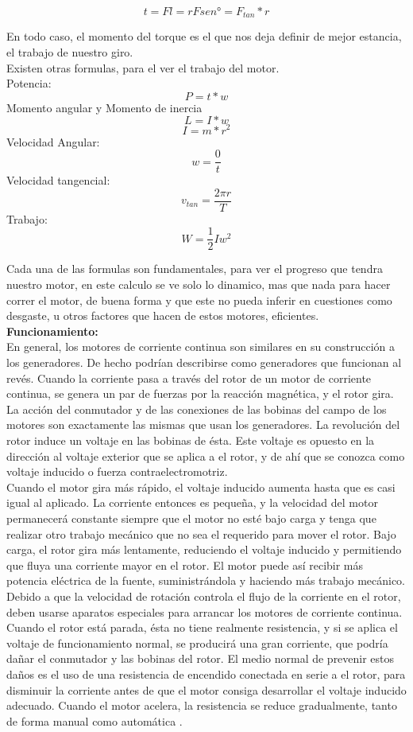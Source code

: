 \documentclass[12pt,a4paper]{article}
\begin{document}
$$ t=Fl=rF sen°=F_{tan}*r $$

En todo caso, el momento del torque es el que nos deja definir de mejor estancia, el trabajo de nuestro giro.\\
Existen otras formulas, para el ver el trabajo del motor.\\
Potencia:
$$ P=t*w $$
Momento angular y Momento de inercia
$$ L=I*w $$ $$ I=m*r^{2} $$
Velocidad Angular:
$$ w=\frac{0}{t} $$
Velocidad tangencial:
$$ v_{tan}=\frac{2\pi r}{T} $$
Trabajo:
$$ W=\dfrac{1}{2}Iw^{2} $$

Cada una de las formulas son fundamentales, para ver el progreso que tendra nuestro motor, en este calculo se ve solo lo dinamico, mas que nada para hacer correr el motor, de buena forma y que este no pueda inferir en cuestiones como desgaste, u otros factores que hacen de estos motores, eficientes.\\

\textbf{Funcionamiento:}\\
En general, los motores de corriente continua son similares en su construcción a los generadores. De hecho podrían describirse como generadores que funcionan al revés. Cuando la corriente pasa a través del rotor de un motor de corriente continua, se genera un par de fuerzas por la reacción magnética, y el rotor gira. La acción del conmutador y de las conexiones de las bobinas del campo de los motores son exactamente las mismas que usan los generadores. La revolución del rotor induce un voltaje en las bobinas de ésta. Este voltaje es opuesto en la dirección al voltaje exterior que se aplica a el rotor, y de ahí que se conozca como voltaje inducido o fuerza contraelectromotriz.\\

Cuando el motor gira más rápido, el voltaje inducido aumenta hasta que es casi igual al aplicado. La corriente entonces es pequeña, y la velocidad del motor permanecerá constante siempre que el motor no esté bajo carga y tenga que realizar otro trabajo mecánico que no sea el requerido para mover el rotor. Bajo carga, el rotor gira más lentamente, reduciendo el voltaje inducido y permitiendo que fluya una corriente mayor en el rotor. El motor puede
así recibir más potencia eléctrica de la fuente, suministrándola y haciendo más trabajo mecánico. Debido a que la velocidad de rotación controla el flujo de la corriente en el rotor, deben usarse aparatos especiales para arrancar los motores de corriente continua. Cuando el rotor está parada, ésta no tiene realmente resistencia, y si se aplica el voltaje de funcionamiento normal, se producirá una gran corriente, que podría dañar el conmutador y las bobinas del rotor. El medio normal de prevenir estos daños es el uso de una resistencia de encendido conectada en serie a el rotor, para disminuir la corriente antes de que el motor consiga desarrollar el voltaje inducido adecuado. Cuando el motor acelera, la resistencia se reduce gradualmente, tanto
de forma manual como automática \cite{pernia2011conceptos} .\\
\end{document}
